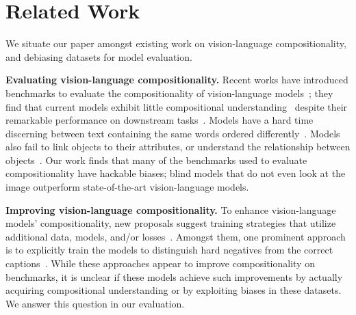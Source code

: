 \section{Related Work}

We situate our paper amongst existing work on vision-language compositionality, and debiasing datasets for model evaluation.

\textbf{Evaluating vision-language compositionality.}
Recent works have introduced benchmarks to evaluate the compositionality of vision-language models~\cite{RadfordKHRGASAM21}; they find that current models exhibit little compositional understanding~\cite{yuksekgonul2023when,thrush2022winoground,zhao2022vl, ma2022crepe, ray2023cola} despite their remarkable performance on downstream tasks~\cite{RadfordKHRGASAM21, 0001LXH22, singh2022flava, alayrac2022flamingo, wang2022omnivl,wang2022image, zhai2022lit}. 
Models have a hard time discerning between text containing the same words ordered differently~\cite{thrush2022winoground}. 
Models also fail to link objects to their attributes, or understand the relationship between objects~\cite{zhao2022vl, yuksekgonul2023when, ray2023cola}.
Our work finds that many of the benchmarks used to evaluate compositionality have hackable biases; blind models that do not even look at the image outperform state-of-the-art vision-language models.

\textbf{Improving vision-language compositionality.} 
To enhance vision-language models’ compositionality, new proposals suggest training strategies that utilize additional data, models, and/or losses~\cite{yuksekgonul2023when, cascantebonilla2023going, ray2023cola, doveh2023teaching, Singh2023CoarsetoFineCL}. Amongst them, one prominent approach is to explicitly train the models to distinguish hard negatives from the correct captions~\cite{yuksekgonul2023when, doveh2023teaching}.
While these approaches appear to improve compositionality on benchmarks, it is unclear if these models achieve such improvements by actually acquiring compositional understanding or by exploiting biases in these datasets. We answer this question in our evaluation.





